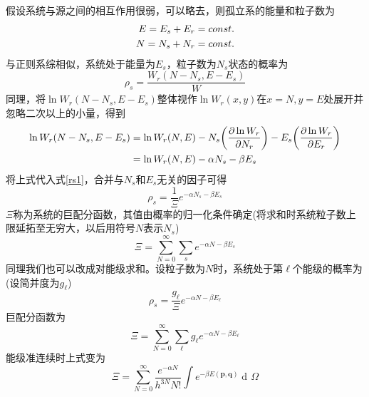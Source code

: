 \documentclass[UTF8,oneside,openany]{ctexbook}
\DeclareMathOperator\dif{d\!}
\begin{document}
假设系统与源之间的相互作用很弱，可以略去，则孤立系的能量和粒子数为
\begin{align}
E=E_s+E_r=const.\notag\\
N=N_s+N_r=const.
\end{align}
与正则系综相似，系统处于能量为$E_s$，粒子数为$N_s$状态的概率为
\begin{equation}\label{rs1}
\rho_s=\frac{W_r(N-N_s,E-E_s)}{W}
\end{equation}
同理，将$\ln W_r(N-N_s,E-E_s)$整体视作$\ln W_r(x,y)$在$x=N,y=E$处展开并忽略二次以上的小量，得到
\begin{align}
\ln W_r(N-N_s,E-E_s)&=\ln W_r(N,E)-N_s\biggl(\frac{\partial\ln W_r}{\partial N_r}\biggr)-E_s\bigg(\frac{\partial\ln W_r}{\partial E_r}\bigg)\notag\\
&=\ln W_r(N,E)-\alpha N_s-\beta E_s
\end{align}
将上式代入式\ref{rs1}，合并与$N_s$和$E_s$无关的因子可得
\begin{equation}
\rho_s=\frac{1}{\Xi}e^{-\alpha N_s-\beta E_s}
\end{equation}
$\Xi$称为系统的巨配分函数，其值由概率的归一化条件确定(将求和时系统粒子数上限延拓至无穷大，以后用符号$N$表示$N_s$)
\begin{equation}
\Xi=\sum_{N=0}^{\infty}\sum_{s}e^{-\alpha N-\beta E_s}
\end{equation}
同理我们也可以改成对能级求和。设粒子数为$N$时，系统处于第$\ell$个能级的概率为(设简并度为$g_{\ell}$)
\begin{equation}
\rho_s=\frac{g_{\ell}}{\Xi}e^{-\alpha N-\beta E_{\ell}}
\end{equation}
巨配分函数为
\begin{equation}
\Xi=\sum_{N=0}^{\infty}\sum_{\ell}g_{\ell}e^{-\alpha N-\beta E_{\ell}}
\end{equation}
能级准连续时上式变为
\begin{equation}
\Xi=\sum_{N=0}^{\infty}\frac{e^{-\alpha N}}{h^{3N}N!}\int e^{-\beta E(\pmb{p},\pmb{q})}\dif\Omega
\end{equation}
\end{document}

